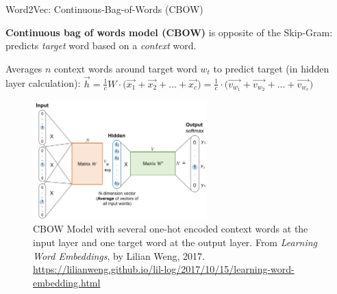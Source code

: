 \begin{frame}{Word2Vec: Continuous-Bag-of-Words (CBOW)}\label{frame:CBOW}

    \vfill 
    
    \begin{itemizeSpaced}{0pt}
        \pinkbox \textbf{Continuous bag of words model (CBOW)} is opposite of the Skip-Gram: predicts \emph{target} word based on a \emph{context} word. 
        
        \item Averages $n$ context words around target word $w_t$ to predict target (in hidden layer calculation): %
        $
        \overrightarrow{h} 
        = \frac{1}{c} W \cdot \Big(\overrightarrow{x_1} + \overrightarrow{x_2} + ... + \overrightarrow{x_c} \Big) 
        = \frac{1}{c} \cdot \Big(\overrightarrow{v_{w_1}} + \overrightarrow{v_{w_2}} + ... + \overrightarrow{v_{w_c}} \Big)
        $
        
    \end{itemizeSpaced}
    
    \begin{figure}[h] 
    \vspace{-25pt}
    \centering
    \includegraphics[width=0.6\textwidth]{imgs/cbow.png}
    \vspace{-5pt}
    \caption{\tiny CBOW Model with several one-hot encoded context words at the input layer and one target word at the output layer. From \emph{Learning Word Embeddings}, by Lilian Weng, 2017. \url{https://lilianweng.github.io/lil-log/2017/10/15/learning-word-embedding.html}}
    \label{fig:CBOW}
    \vspace{-15pt}
    \end{figure}
    
    
\end{frame}



